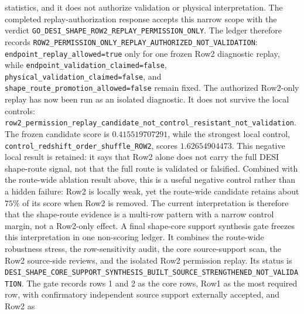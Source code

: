 \documentclass[11pt]{article}
\begin{document}
statistics, and it does not authorize validation or physical interpretation.
The completed replay-authorization response accepts this narrow scope with the
verdict
\texttt{GO\_\allowbreak{}DESI\_\allowbreak{}SHAPE\_\allowbreak{}ROW2\_\allowbreak{}REPLAY\_\allowbreak{}PERMISSION\_\allowbreak{}ONLY}.  The ledger therefore
records
\texttt{ROW2\_\allowbreak{}PERMISSION\_\allowbreak{}ONLY\_\allowbreak{}REPLAY\_\allowbreak{}AUTHORIZED\_\allowbreak{}NOT\_\allowbreak{}VALIDATION}:
\texttt{endpoint\_\allowbreak{}replay\_\allowbreak{}allowed=\allowbreak{}true} only for one frozen Row2 diagnostic
replay, while \texttt{endpoint\_\allowbreak{}validation\_\allowbreak{}claimed=\allowbreak{}false},
\texttt{physical\_\allowbreak{}validation\_\allowbreak{}claimed=\allowbreak{}false}, and
\texttt{shape\_\allowbreak{}route\_\allowbreak{}promotion\_\allowbreak{}allowed=\allowbreak{}false} remain fixed.
The authorized Row2-only replay has now been run as an isolated diagnostic.  It
does not survive the local controls:
\texttt{row2\_\allowbreak{}permission\_\allowbreak{}replay\_\allowbreak{}candidate\_\allowbreak{}not\_\allowbreak{}control\_\allowbreak{}resistant\_\allowbreak{}not\_\allowbreak{}validation}.
The frozen candidate score is \(0.415519707291\), while the strongest local
control, \texttt{control\_\allowbreak{}redshift\_\allowbreak{}order\_\allowbreak{}shuffle\_\allowbreak{}ROW2}, scores
\(1.62654904473\).  This negative local result is retained: it says that Row2
alone does not carry the full DESI shape-route signal, not that the full route
is validated or falsified.
Combined with the route-wide ablation result above, this is a useful negative
control rather than a hidden failure: Row2 is locally weak, yet the route-wide
candidate retains about \(75\%\) of its score when Row2 is removed.  The current
interpretation is therefore that the shape-route evidence is a multi-row
pattern with a narrow control margin, not a Row2-only effect.
A final shape-core support synthesis gate freezes this interpretation in one
non-scoring ledger.  It combines the route-wide robustness stress, the
row-sensitivity audit, the core source-support scan, the Row2 source-side
reviews, and the isolated Row2 permission replay.  Its status is
\texttt{DESI\_\allowbreak{}SHAPE\_\allowbreak{}CORE\_\allowbreak{}SUPPORT\_\allowbreak{}SYNTHESIS\_\allowbreak{}BUILT\_\allowbreak{}SOURCE\_\allowbreak{}STRENGTHENED\_\allowbreak{}NOT\_\allowbreak{}VALIDATION}.
The gate records rows 1 and 2 as the core rows, Row1 as the most required row,
with confirmatory independent source support externally accepted, and Row2 as
\end{document}
